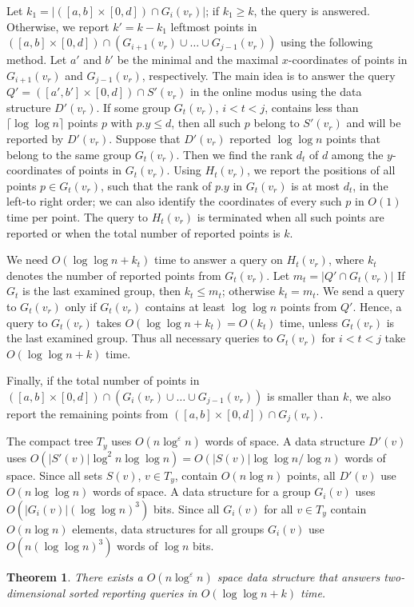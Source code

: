 \documentclass[11pt]{article}
\def\ceil#1{\lceil #1 \rceil}
\newtheorem{theorem}{Theorem}
\newcommand{\eps}{\varepsilon}
\begin{document}
 
Let $k_1=|([a,b]\times [0,d])\cap G_i(v_r)|$; if $k_1\ge k$, the query
is answered. Otherwise, we report $k'=k-k_1$ leftmost points in
$([a,b]\times [0,d])\cap (G_{i+1}(v_r)\cup\ldots\cup G_{j-1}(v_r))$
using the following method.  Let $a'$ and $b'$ be the minimal and
the maximal $x$-coordinates of points in $G_{i+1}(v_r)$ and
$G_{j-1}(v_r)$, respectively.  The main idea is to answer the query
$Q'=([a',b']\times [0,d])\cap S'(v_r)$ in the online modus using the data structure
$D'(v_r)$. If some group $G_t(v_r)$, $i<t<j$, contains less than $\ceil{\log
\log n}$ points $p$ with $p.y\le d$, then all such $p$ belong to
$S'(v_r)$ and will be reported by $D'(v_r)$.  Suppose that $D'(v_r)$
reported $\log \log n$ points that belong to the same group
$G_t(v_r)$. Then we find the rank $d_t$ of $d$ among the
$y$-coordinates of points in $G_t(v_r)$. Using $H_t(v_r)$, we report
the positions of all points $p\in G_t(v_r)$, such that the rank of
$p.y$ in $G_t(v_r)$ is at most $d_t$, in the left-to right order; we can
also identify the coordinates of every such $p$ in $O(1)$ time per point.
The query to $H_t(v_r)$ is terminated when all such points are
reported or when the total number of reported points is $k$.

We need $O(\log \log n +k_t)$ time to answer a query on $H_t(v_r)$, where 
$k_t$ denotes the number of reported points from $G_t(v_r)$.  
Let $m_t=|Q'\cap G_t(v_r)|$
If $G_t$ is the last examined group, then $k_t\le m_t$; otherwise 
$k_t=m_t$.
We send a query to $G_t(v_r)$ only if $G_t(v_r)$ contains at least 
$\log \log n$ points from  $Q'$. 
Hence,  a query to $G_t(v_r)$ takes $O(\log \log n + k_t)=O(k_t)$ time, 
unless $G_t(v_r)$ is the last examined group. 
Thus all necessary queries to $G_t(v_r)$ for $i{<}t{<}j$ take $O(\log \log n + k)$ time.

Finally, if the total number of points in $([a,b]\times [0,d])\cap (G_i(v_r)\cup\ldots\cup G_{j-1}(v_r))$ is smaller than $k$, we also report the remaining points from $([a,b]\times [0,d])\cap G_j(v_r)$. 

The compact tree $T_y$ uses $O(n\log^{\eps}n)$ words of space.  
A data structure $D'(v)$ uses $O(|S'(v)|\log^2 n\log\log n)= O(|S(v)|\log \log n/\log n)$ words 
of space. Since all sets $S(v)$, $v\in T_y$, contain $O(n\log n)$ 
points, all $D'(v)$ use $O(n\log \log n)$ words of space.  
A data structure for a group $G_i(v)$  uses $O(|G_i(v)|(\log \log n)^3)$
 bits. Since all $G_i(v)$ for all $v\in T_y$ contain $O(n\log n)$ elements, data structures for all groups $G_i(v)$ use $O(n(\log \log n)^3)$ 
words of $\log n$ bits. 
\begin{theorem}\label{theor:2dim}
  There exists a $O(n\log^{\eps} n)$ space data structure that answers
  two-dimensional sorted reporting queries in $O(\log \log n + k)$ time.
\end{theorem}
\end{document}
